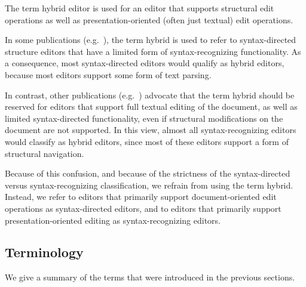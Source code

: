 
The term hybrid editor is used for an editor that supports structural edit operations as well as presentation-oriented (often just textual) edit operations.

In some publications (e.g.~\cite{teitelbaum81progSynth, minor90editing}), the term hybrid is used to refer to syntax-directed structure editors that have a limited form of syntax-recognizing functionality. As a consequence, most syntax-directed editors would qualify as hybrid editors, because most editors support some form of text parsing.

In contrast, other publications (e.g.~\cite{ballance92pan, koorn92gse}) advocate that the term hybrid should be reserved for editors that support full textual editing of the document, as well as limited syntax-directed functionality, even if structural modifications on the document are not supported. In this view, almost all syntax-recognizing editors would classify as hybrid editors, since most of these editors support a form of structural navigation.


Because of this confusion, and because of the strictness of the syntax-directed versus syntax-recognizing classification, we refrain from using the term hybrid. Instead, we refer to editors that primarily support document-oriented edit operations as syntax-directed editors, and to editors that primarily support presentation-oriented editing as syntax-recognizing editors.

\subsection{Terminology}

We give a summary of the terms that were introduced in the previous sections.

